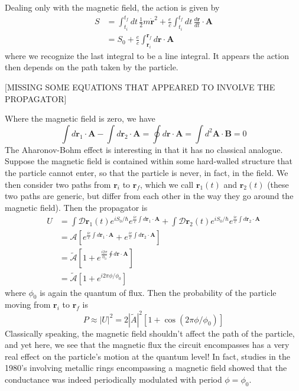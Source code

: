 \documentclass{article}
\begin{document}
	\noindent Dealing only with the magnetic field, the action is given by
	\begin{align*}
	S&=\int_{t_i}^{t_f}dt\,\frac{1}{2}m\dot{\mathbf{r}}^2+\frac{e}{c}\int_{t_i}^{t_f}dt\,\frac{d\mathbf{r}}{dt}\cdot\mathbf{A}\\
	&=S_0+\frac{e}{c}\int_{\mathbf{r}_i}^{\mathbf{r}_f}d\mathbf{r}\cdot\mathbf{A}
	\end{align*}
	where we recognize the last integral to be a line integral. It appears the action then depends on the path taken by the particle.\\
	\begin{center}
	[MISSING SOME EQUATIONS THAT APPEARED TO INVOLVE THE PROPAGATOR]
	\end{center}
	Where the magnetic field is zero, we have
	$$\int d\mathbf{r}_1\cdot\mathbf{A}-\int d\mathbf{r}_2\cdot\mathbf{A}=\oint d\mathbf{r}\cdot\mathbf{A}=\int d^2\mathbf{A}\cdot\mathbf{B}=0$$
	The Aharonov-Bohm effect is interesting in that it has no classical analogue. Suppose the magnetic field is contained within some hard-walled structure that the particle cannot enter, so that the particle is never, in fact, in the field. We then consider two paths from $\mathbf{r}_i$ to $\mathbf{r}_f$, which we call $\mathbf{r}_1(t)$ and $\mathbf{r}_2(t)$ (these two paths are generic, but differ from each other in the way they go around the magnetic field). Then the propagator is
	\begin{align*}U&=\int\mathcal{D}\mathbf{r}_1(t)e^{iS_0/\hbar}e^{\frac{ie}{c}\int d\mathbf{r}_1\cdot\mathbf{A}}+\int\mathcal{D}\mathbf{r}_2(t)e^{iS_0/\hbar}e^{\frac{ie}{c}\int d\mathbf{r}_2\cdot\mathbf{A}}\\
	&=\mathcal{A}\left[e^{\frac{ie}{c}\int d\mathbf{r}_1\cdot\mathbf{A}}+e^{\frac{ie}{c}\int d\mathbf{r}_2\cdot\mathbf{A}}\right]\\
	&=\tilde{\mathcal{A}}\left[1+e^{\frac{i2\pi}{\phi_0}\oint d\mathbf{r}\cdot\mathbf{A}}\right]\\
	&=\tilde{\mathcal{A}}\left[1+e^{i2\pi\phi/\phi_0}\right]
	\end{align*}
	where $\phi_0$ is again the quantum of flux. Then the probability of the particle moving from $\mathbf{r}_i$ to $\mathbf{r}_f$ is
	$$P\approx \left|U\right|^2=2\left|\tilde{A}\right|^2\left[1+\cos(2\pi\phi/\phi_0)\right]$$
	Classically speaking, the magnetic field shouldn't affect the path of the particle, and yet here, we see that the magnetic flux the circuit encompasses has a very real effect on the particle's motion at the quantum level! In fact, studies in the 1980's involving metallic rings encompassing a magnetic field showed that the conductance was indeed periodically modulated with period $\phi=\phi_0$.
\end{document}
